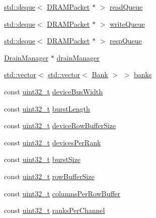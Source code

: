 \begin{DoxyCompactItemize}
\item 
\hyperlink{classstd_1_1deque}{std::deque}$<$ \hyperlink{classDRAMCtrl_1_1DRAMPacket}{DRAMPacket} $\ast$ $>$ \hyperlink{classDRAMCtrl_af799cb4e1a6e82bcb68ff9354bdf6876}{readQueue}
\item 
\hyperlink{classstd_1_1deque}{std::deque}$<$ \hyperlink{classDRAMCtrl_1_1DRAMPacket}{DRAMPacket} $\ast$ $>$ \hyperlink{classDRAMCtrl_a3286652a16bd92e1fd02c6a5f42b83a1}{writeQueue}
\item 
\hyperlink{classstd_1_1deque}{std::deque}$<$ \hyperlink{classDRAMCtrl_1_1DRAMPacket}{DRAMPacket} $\ast$ $>$ \hyperlink{classDRAMCtrl_a04637ab08ad048aa826537a67dba4654}{respQueue}
\item 
\hyperlink{classDrainManager}{DrainManager} $\ast$ \hyperlink{classDRAMCtrl_a329b71fb934a93312ca0aacbf5a3f982}{drainManager}
\item 
\hyperlink{classstd_1_1vector}{std::vector}$<$ \hyperlink{classstd_1_1vector}{std::vector}$<$ \hyperlink{classDRAMCtrl_1_1Bank}{Bank} $>$ $>$ \hyperlink{classDRAMCtrl_ac4dd7a78e52bcaca6fb18d24b45bb7f3}{banks}
\item 
const \hyperlink{Type_8hh_a435d1572bf3f880d55459d9805097f62}{uint32\_\-t} \hyperlink{classDRAMCtrl_a9b8ba3e3a3cc11b904cd1b70e7a40ea5}{deviceBusWidth}
\item 
const \hyperlink{Type_8hh_a435d1572bf3f880d55459d9805097f62}{uint32\_\-t} \hyperlink{classDRAMCtrl_a7ac4e4b031082616f09700ea29168920}{burstLength}
\item 
const \hyperlink{Type_8hh_a435d1572bf3f880d55459d9805097f62}{uint32\_\-t} \hyperlink{classDRAMCtrl_afdaeeb74e1622ca1cc0f00dcf937a3b0}{deviceRowBufferSize}
\item 
const \hyperlink{Type_8hh_a435d1572bf3f880d55459d9805097f62}{uint32\_\-t} \hyperlink{classDRAMCtrl_a962c654402093dcbdd4b40fd32c0de69}{devicesPerRank}
\item 
const \hyperlink{Type_8hh_a435d1572bf3f880d55459d9805097f62}{uint32\_\-t} \hyperlink{classDRAMCtrl_aed1f7024fc9eeb4654afe54d86683d76}{burstSize}
\item 
const \hyperlink{Type_8hh_a435d1572bf3f880d55459d9805097f62}{uint32\_\-t} \hyperlink{classDRAMCtrl_abe6f704496dadf8c0b246eb57b4e25d5}{rowBufferSize}
\item 
const \hyperlink{Type_8hh_a435d1572bf3f880d55459d9805097f62}{uint32\_\-t} \hyperlink{classDRAMCtrl_a1f84aad3340018bfb3c46ace200df8cb}{columnsPerRowBuffer}
\item 
const \hyperlink{Type_8hh_a435d1572bf3f880d55459d9805097f62}{uint32\_\-t} \hyperlink{classDRAMCtrl_afb57a2b8af54b8949b2c14434c74bd98}{ranksPerChannel}

\end{DoxyCompactItemize}
